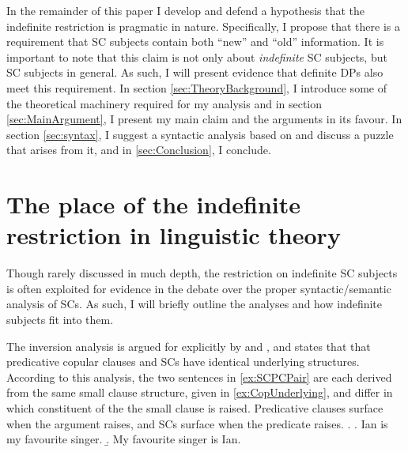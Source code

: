 \documentclass[letterpaper]{article}
\begin{document}
In the remainder of this paper I develop and defend a hypothesis that the indefinite restriction is pragmatic in nature.
Specifically, I propose that there is a requirement that SC subjects contain both ``new'' and ``old'' information.
It is important to note that this claim is not only about \textit{indefinite} SC subjects, but SC subjects in general.
As such, I will present evidence that definite DPs also meet this requirement.
In section \ref{sec:TheoryBackground}, I introduce some of the theoretical machinery required for my analysis and in section \ref{sec:MainArgument}, I present my main claim and the arguments in its favour.
In section \ref{sec:syntax}, I suggest a syntactic analysis based on \textcite{constant2014diss} and discuss a puzzle that arises from it, and in \ref{sec:Conclusion}, I conclude.
\section{The place of the indefinite restriction in linguistic theory}\label{sec:LitReview}
Though rarely discussed in much depth, the restriction on indefinite SC subjects is often exploited for evidence in the debate over the proper syntactic/semantic analysis of SCs.
As such, I will briefly outline the analyses and how indefinite subjects fit into them.

The inversion analysis is argued for explicitly by \textcite{mikkelsen2005copular} and \textcite{moro1997raising}, and states that that predicative copular clauses and SCs have identical underlying structures.
According to this analysis, the two sentences in \ref{ex:SCPCPair} are each derived from the same small clause structure, given in \ref{ex:CopUnderlying}, and differ in which constituent of the the small clause is raised.
Predicative clauses surface when the argument raises, and SCs surface when the predicate raises.
\ex.\label{ex:SCPCPair}
\a.\label{ex:SCPCPairPC} Ian is my favourite singer.
\b.\label{ex:SCPCPairSC} My favourite singer is Ian.
\end{document}
